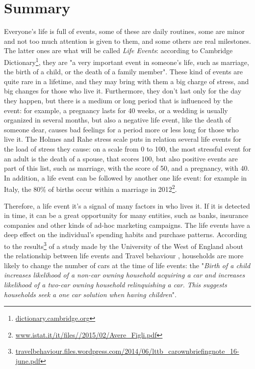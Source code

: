 \chapter*{Summary} %
\label{summary}
Everyone's life is full of events, some of these are daily routines, some are minor and not too much attention is given to them, and some others are real milestones. The latter ones are what will be called \textit{Life Events}: according to Cambridge Dictionary\footnote{\url{dictionary.cambridge.org}}, they are "a very important event in someone's life, such as marriage, the birth of a child, or the death of a family member". These kind of events are quite rare in a lifetime, and they may bring with them a big charge of stress, and big changes for those who live it. Furthermore, they don't last only for the day they happen, but there is a medium or long period that is influenced by the event: for example, a pregnancy lasts for 40 weeks, or a wedding is usually organized in several months, but also a negative life event, like the death of someone dear, causes bad feelings for a period more or less long for those who live it. The Holmes and Rahe stress scale \cite{holmes1967social} puts in relation several life events for the load of stress they cause: on a scale from 0 to 100, the most stressful event for an adult is the death of a spouse, that scores 100, but also positive events are part of this list, such as marriage, with the score of 50, and a pregnancy, with 40. In addition, a life event can be followed by another one life event: for example in Italy, the 80\% of births occur within a marriage in 2012\footnote{\url{www.istat.it/it/files//2015/02/Avere_Figli.pdf}}.

Therefore, a life event it's a signal of many factors in who lives it. If it is detected in time, it can be a great opportunity for many entities, such as banks, insurance companies and other kinds of ad-hoc marketing campaigns. The life events have a deep effect on the individual's spending habits and purchase patterns. According to the results\footnote{\url{travelbehaviour.files.wordpress.com/2014/06/lttb_carownbriefingnote_16-june.pdf}} of a study made by the University of the West of England about the relationship between life events and Travel behaviour \cite{chatterjee2015facts}, households are more likely to change the number of cars at the time of life events: the "\textit{Birth of a child increases likelihood of a non-car owning household acquiring a car and increases likelihood of a two-car owning household relinquishing a car. This suggests households seek a one car solution when having children}".

